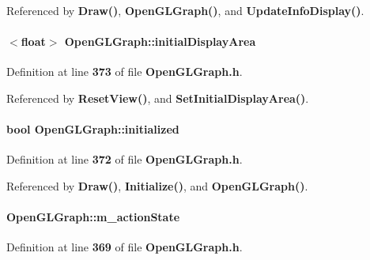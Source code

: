 Referenced by {\bf Draw()}, {\bf Open\+G\+L\+Graph()}, and {\bf Update\+Info\+Display()}.

\paragraph[{initial\+Display\+Area}]{$<$float$>$ Open\+G\+L\+Graph\+::initial\+Display\+Area\hspace{0.3cm}{\ttfamily [private]}}\label{classOpenGLGraph_a882d9bd4e6422a68fcdf16a670be05b1}


Definition at line {\bf 373} of file {\bf Open\+G\+L\+Graph.\+h}.



Referenced by {\bf Reset\+View()}, and {\bf Set\+Initial\+Display\+Area()}.

\paragraph[{initialized}]{\setlength{\rightskip}{0pt plus 5cm}bool Open\+G\+L\+Graph\+::initialized\hspace{0.3cm}{\ttfamily [private]}}\label{classOpenGLGraph_a1283c7b00d3c6dea68bfafab424c3dcb}


Definition at line {\bf 372} of file {\bf Open\+G\+L\+Graph.\+h}.



Referenced by {\bf Draw()}, {\bf Initialize()}, and {\bf Open\+G\+L\+Graph()}.

\paragraph[{m\+\_\+action\+State}]{ Open\+G\+L\+Graph\+::m\+\_\+action\+State\hspace{0.3cm}{\ttfamily [private]}}\label{classOpenGLGraph_a0bf92d11052cda61b871d661d36aba2a}


Definition at line {\bf 369} of file {\bf Open\+G\+L\+Graph.\+h}.



